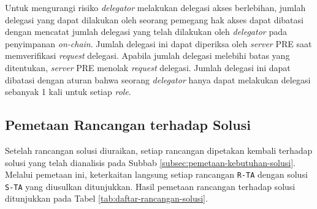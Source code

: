 \documentclass[bahasa, 12pt, a4paper, onecolumn, oneside, final]{report}
\begin{document}
Untuk mengurangi risiko \textit{delegator} melakukan delegasi akses berlebihan, jumlah delegasi yang dapat dilakukan oleh seorang pemegang hak akses dapat dibatasi dengan mencatat jumlah delegasi yang telah dilakukan oleh \textit{delegator} pada penyimpanan \textit{on-chain}. Jumlah delegasi ini dapat diperiksa oleh \textit{server} PRE saat memverifikasi \textit{request} delegasi. Apabila jumlah delegasi melebihi batas yang ditentukan, \textit{server} PRE menolak \textit{request} delegasi. Jumlah delegasi ini dapat dibatasi dengan aturan bahwa seorang \textit{delegator} hanya dapat melakukan delegasi sebanyak 1 kali untuk setiap \textit{role}. \subsection{Pemetaan Rancangan terhadap Solusi}
\label{subsec:pemetaan-rancangan-solusi}

Setelah rancangan solusi diuraikan, setiap rancangan dipetakan kembali terhadap solusi yang telah dianalisis pada Subbab \ref{subsec:pemetaan-kebutuhan-solusi}. Melalui pemetaan ini, keterkaitan langsung setiap rancangan \texttt{R-TA} dengan solusi \texttt{S-TA} yang diusulkan ditunjukkan. Hasil pemetaan rancangan terhadap solusi ditunjukkan pada Tabel \ref{tab:daftar-rancangan-solusi}.
\end{document}
